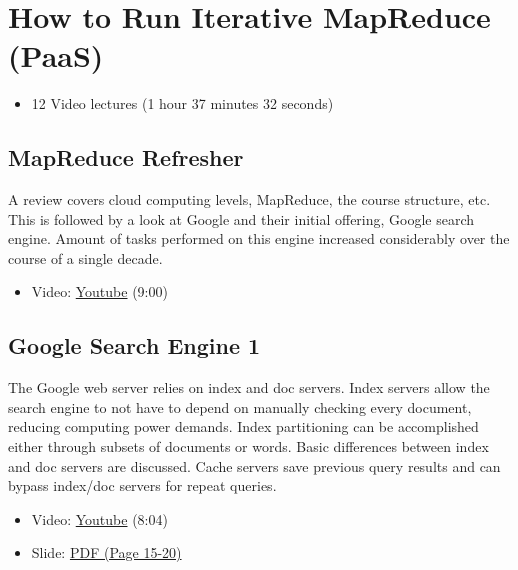 \section{How to Run Iterative MapReduce
(PaaS)}\label{how-to-run-iterative-mapreduce-paas}

\begin{itemize}
\tightlist
\item
  12 Video lectures (1 hour 37 minutes 32 seconds)
\end{itemize}

\subsection{MapReduce Refresher}\label{mapreduce-refresher}

A review covers cloud computing levels, MapReduce, the course structure,
etc. This is followed by a look at Google and their initial offering,
Google search engine. Amount of tasks performed on this engine increased
considerably over the course of a single decade.

\begin{itemize}
\tightlist
\item
  Video: \href{https://www.youtube.com/watch?v=0TRTdzgC_N0}{Youtube}
  (9:00)
\end{itemize}

\subsection{Google Search Engine 1}\label{google-search-engine-1}

The Google web server relies on index and doc servers. Index servers
allow the search engine to not have to depend on manually checking every
document, reducing computing power demands. Index partitioning can be
accomplished either through subsets of documents or words. Basic
differences between index and doc servers are discussed. Cache servers
save previous query results and can bypass index/doc servers for repeat
queries.

\begin{itemize}
\tightlist
\item
  Video: \href{https://www.youtube.com/watch?v=S2oT7uMw5Yg}{Youtube}
  (8:04)
\end{itemize}

\begin{itemize}
\tightlist
\item
  Slide:
  \href{https://drive.google.com/open?id=0B88HKpainTSfYWZ0dDlrNThkVms}{PDF
  (Page 15-20)}
\end{itemize}

